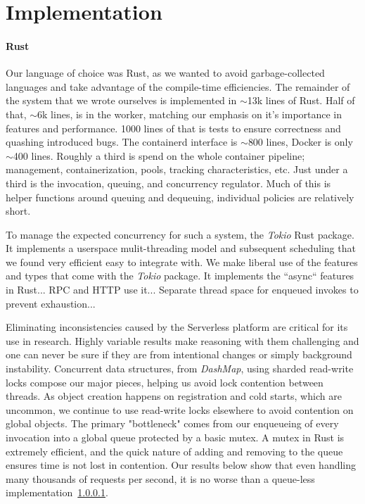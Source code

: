 \section{Implementation}


\paragraph{Rust}



Our language of choice was Rust, as we wanted to avoid garbage-collected languages and take advantage of the compile-time efficiencies.
The remainder of the system that we wrote ourselves is implemented in $\sim$13k lines of Rust.
Half of that, $\sim$6k lines, is in the worker, matching our emphasis on it's importance in features and performance.
1000 lines of that is tests to ensure correctness and quashing introduced bugs.
The containerd interface is $\sim$800 lines, Docker is only $\sim$400 lines.
Roughly a third is spend on the whole container pipeline; management, containerization, pools, tracking characteristics, etc.
Just under a third is the invocation, queuing, and concurrency regulator.
Much of this is helper functions around queuing and dequeuing, individual policies are relatively short.

To manage the expected concurrency for such a system, the \emph{Tokio} Rust package.
It implements a userspace mulit-threading model and subsequent scheduling that we found very efficient easy to integrate with.
We make liberal use of the features and types that come with the \emph{Tokio} package.
It implements the ``async`` features in Rust...
RPC and HTTP use it...
Separate thread space for enqueued invokes to prevent exhaustion...



Eliminating inconsistencies caused by the Serverless platform are critical for its use in research.
Highly variable results make reasoning with them challenging and one can never be sure if they are from intentional changes or simply background instability.
Concurrent data structures, from \emph{DashMap}, using sharded read-write locks compose our major pieces, helping us avoid lock contention between threads.
As object creation happens on registration and cold starts, which are uncommon, we continue to use read-write locks elsewhere to avoid contention on global objects.
The primary "bottleneck" comes from our enqueueing of every invocation into a global queue protected by a basic mutex.
A mutex in Rust is extremely efficient, and the quick nature of adding and removing to the queue ensures time is not lost in contention.
Our results below show that even handling many thousands of requests per second, it is no worse than a queue-less implementation~\ref{}.

